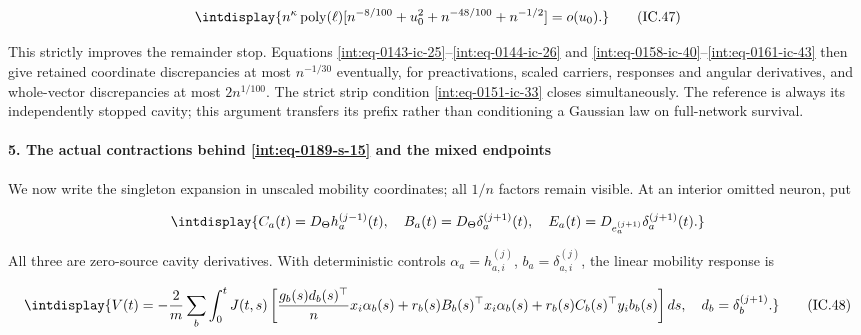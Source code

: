 \begingroup\renewcommand{\theHequation}{intdisplay.349}
\begin{equation}
\intdisplay{
n^\kappa\operatorname{poly}(\ell)
       [n^{-8/100}+u_0^2+n^{-48/100}+n^{-1/2}]
                     =o(u_0).
}
\tag{IC.47}
\label{int:eq-0165-ic-47}
\end{equation}
\endgroup


This strictly improves the remainder stop. Equations \eqref{int:eq-0143-ic-25}--\allowbreak \eqref{int:eq-0144-ic-26} and \eqref{int:eq-0158-ic-40}--\allowbreak \eqref{int:eq-0161-ic-43} then give retained coordinate discrepancies at most \(n^{-1/30}\) eventually, for preactivations, scaled carriers, responses and angular derivatives, and whole-vector discrepancies at most \(2n^{1/100}\). The strict strip condition \eqref{int:eq-0151-ic-33} closes simultaneously. The reference is always its independently stopped cavity; this argument transfers its prefix rather than conditioning a Gaussian law on full-network survival.


\paragraph{5. The actual contractions behind \eqref{int:eq-0189-s-15} and the mixed endpoints}

\mbox{}\par\smallskip


We now write the singleton expansion in unscaled mobility coordinates; all \(1/n\) factors remain visible. At an interior omitted neuron, put


\begingroup\renewcommand{\theHequation}{intdisplay.350}
\begin{equation*}
\intdisplay{
C_a(t)=D_\Theta h_a^{(j-1)}(t),\quad
 B_a(t)=D_\Theta\delta_a^{(j+1)}(t),\quad
 E_a(t)=D_{e_a^{(j+1)}}\delta_a^{(j+1)}(t).
}
\end{equation*}
\endgroup


All three are zero-source cavity derivatives. With deterministic controls \(\alpha_a=h_{a,\allowbreak i}^{(j)}\), \(b_a=\delta_{a,\allowbreak i}^{(j)}\), the linear mobility response is


\begingroup\renewcommand{\theHequation}{intdisplay.351}
\begin{equation}
\intdisplay{
V(t)=-\frac{2}{m}\sum_b\int_0^t J(t,s)
 \left[\frac{g_b(s)d_b(s)^\top}{n}x_i\alpha_b(s)
       +r_b(s)B_b(s)^\top x_i\alpha_b(s)
       +r_b(s)C_b(s)^\top y_i b_b(s)\right]ds,
 \quad d_b=\delta_b^{(j+1)}.
}
\tag{IC.48}
\label{int:eq-0166-ic-48}
\end{equation}
\endgroup

